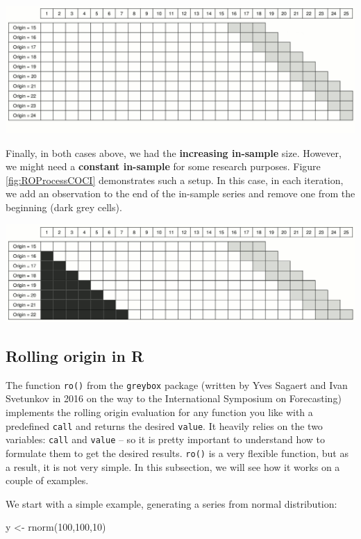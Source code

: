 \documentclass[
]{book}
\newenvironment{Shaded}{\begin{snugshade}}{\end{snugshade}}
\newcommand{\DecValTok}[1]{\textcolor[rgb]{0.00,0.00,0.81}{#1}}
\newcommand{\FunctionTok}[1]{\textcolor[rgb]{0.00,0.00,0.00}{#1}}
\newcommand{\NormalTok}[1]{#1}
\newcommand{\OtherTok}[1]{\textcolor[rgb]{0.56,0.35,0.01}{#1}}
\theoremstyle{definition}
\theoremstyle{definition}
\theoremstyle{definition}
\theoremstyle{definition}
\theoremstyle{remark}
\begin{document}
\includegraphics{./images/03-ROProcessNoCO.jpg}

Finally, in both cases above, we had the \textbf{increasing in-sample} size. However, we might need a \textbf{constant in-sample} for some research purposes. Figure \ref{fig:ROProcessCOCI} demonstrates such a setup. In this case, in each iteration, we add an observation to the end of the in-sample series and remove one from the beginning (dark grey cells).

\includegraphics{./images/03-ROProcessCOCI.jpg}

\hypertarget{rolling-origin-in-r}{%
\subsection{Rolling origin in R}\label{rolling-origin-in-r}}

The function \texttt{ro()} from the \texttt{greybox} package (written by Yves Sagaert and Ivan Svetunkov in 2016 on the way to the International Symposium on Forecasting) implements the rolling origin evaluation for any function you like with a predefined \texttt{call} and returns the desired \texttt{value}. It heavily relies on the two variables: \texttt{call} and \texttt{value} -- so it is pretty important to understand how to formulate them to get the desired results. \texttt{ro()} is a very flexible function, but as a result, it is not very simple. In this subsection, we will see how it works on a couple of examples.

We start with a simple example, generating a series from normal distribution:

\begin{Shaded}
\begin{Highlighting}[]
\NormalTok{y }\OtherTok{\textless{}{-}} \FunctionTok{rnorm}\NormalTok{(}\DecValTok{100}\NormalTok{,}\DecValTok{100}\NormalTok{,}\DecValTok{10}\NormalTok{)}
\end{Highlighting}
\end{Shaded}
\end{document}

